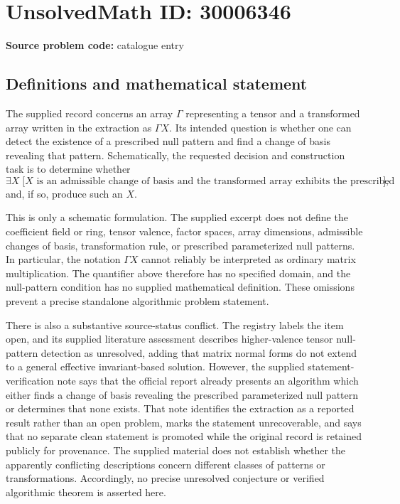 \documentclass[11pt]{article}
\begin{document}
\section*{UnsolvedMath ID: 30006346}
\textbf{Source problem code:} catalogue entry
\subsection{Definitions and mathematical statement}
The supplied record concerns an array \(\Gamma\) representing a tensor and a transformed array written in the extraction as \(\Gamma X\). Its intended question is whether one can detect the existence of a prescribed null pattern and find a change of basis revealing that pattern. Schematically, the requested decision and construction task is to determine whether
\[
\exists X\;\bigl[\text{\(X\) is an admissible change of basis and the transformed array exhibits the prescribed null pattern}\bigr],
\]
and, if so, produce such an \(X\).

This is only a schematic formulation. The supplied excerpt does not define the coefficient field or ring, tensor valence, factor spaces, array dimensions, admissible changes of basis, transformation rule, or prescribed parameterized null patterns. In particular, the notation \(\Gamma X\) cannot reliably be interpreted as ordinary matrix multiplication. The quantifier above therefore has no specified domain, and the null-pattern condition has no supplied mathematical definition. These omissions prevent a precise standalone algorithmic problem statement.

There is also a substantive source-status conflict. The registry labels the item open, and its supplied literature assessment describes higher-valence tensor null-pattern detection as unresolved, adding that matrix normal forms do not extend to a general effective invariant-based solution. However, the supplied statement-verification note says that the official report already presents an algorithm which either finds a change of basis revealing the prescribed parameterized null pattern or determines that none exists. That note identifies the extraction as a reported result rather than an open problem, marks the statement unrecoverable, and says that no separate clean statement is promoted while the original record is retained publicly for provenance. The supplied material does not establish whether the apparently conflicting descriptions concern different classes of patterns or transformations. Accordingly, no precise unresolved conjecture or verified algorithmic theorem is asserted here.
\end{document}
